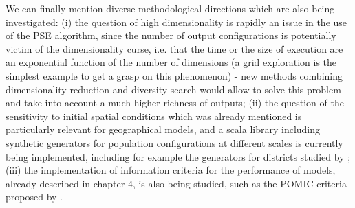 \documentclass[10pt]{article}
\begin{document}
We can finally mention diverse methodological directions which are also being investigated: (i) the question of high dimensionality is rapidly an issue in the use of the PSE algorithm, since the number of output configurations is potentially victim of the dimensionality curse, i.e. that the time or the size of execution are an exponential function of the number of dimensions (a grid exploration is the simplest example to get a grasp on this phenomenon) - new methods combining dimensionality reduction and diversity search would allow to solve this problem and take into account a much higher richness of outputs; (ii) the question of the sensitivity to initial spatial conditions which was already mentioned \citep{raimbault2018space} is particularly relevant for geographical models, and a scala library including synthetic generators for population configurations at different scales is currently being implemented, including for example the generators for districts studied by \cite{raimbault2019generating}; (iii) the implementation of information criteria for the performance of models, already described in chapter 4, is also being studied, such as the POMIC criteria proposed by \cite{piou2009proposing}.
\end{document}
